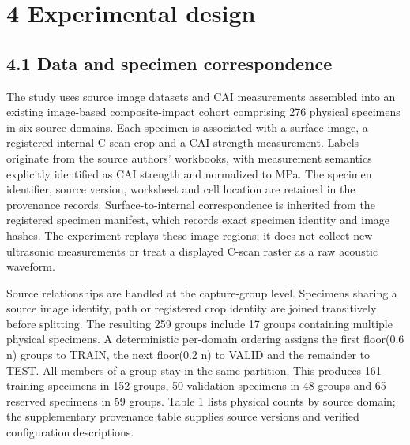 \section{4 Experimental design}\label{experimental-design}

\subsection{4.1 Data and specimen correspondence}\label{data-and-specimen-correspondence}

The study uses source image datasets \citep{hasebe2022data} and CAI measurements \citep{hasebe2025data, data_cai} assembled into an existing image-based composite-impact cohort comprising 276 physical specimens in six source domains. Each specimen is associated with a surface image, a registered internal C-scan crop and a CAI-strength measurement. Labels originate from the source authors' workbooks, with measurement semantics explicitly identified as CAI strength and normalized to MPa. The specimen identifier, source version, worksheet and cell location are retained in the provenance records. Surface-to-internal correspondence is inherited from the registered specimen manifest, which records exact specimen identity and image hashes. The experiment replays these image regions; it does not collect new ultrasonic measurements or treat a displayed C-scan raster as a raw acoustic waveform.

Source relationships are handled at the capture-group level. Specimens sharing a source image identity, path or registered crop identity are joined transitively before splitting. The resulting 259 groups include 17 groups containing multiple physical specimens. A deterministic per-domain ordering assigns the first floor(0.6 n) groups to TRAIN, the next floor(0.2 n) to VALID and the remainder to TEST. All members of a group stay in the same partition. This produces 161 training specimens in 152 groups, 50 validation specimens in 48 groups and 65 reserved specimens in 59 groups. Table 1 lists physical counts by source domain; the supplementary provenance table supplies source versions and verified configuration descriptions.

